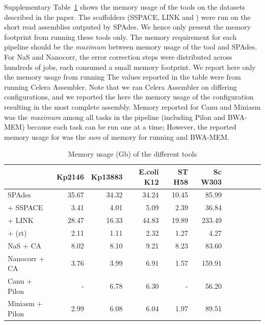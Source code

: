 Supplementary Table~\ref{T:mem} shows the memory usage of the tools on
the datasets described in the paper. The scaffolders (SSPACE, LINK and
\npscarf{}) were run on the short read assemblies outputed by SPAdes. We hence
only present the memory footprint from running these tools only. The memory
requirement for each pipeline should be the \emph{maximum} between memory usage
of the tool and SPAdes. For NaS and Nanocorr, the error correction steps were
distributed across hundreds of jobs, each consumed a small memory footprint. We
report here only the memory usage from running  The values reported in the table
were from running Celera Assembler. Note that we ran Celera Assembler on
differing configurations, and we reported the here the memory usage of the
configuration resulting in the most complete assembly.
Memory reported for Canu and Miniasm was the \emph{maximum} among all tasks
in the pipeline (including Pilon and BWA-MEM) because each task can be run one
at a time; However, the reported memory usage for \npscarf{} was the \emph{sum} of 
memory for running \npscarf{} and BWA-MEM.
\begin{table}[!hpt]
\centering
\caption{Memory usage (Gb) of the different tools}
\label{T:mem}
\begin{tabular}{lrrrrrrrrrr}
\toprule
 & Kp2146 & Kp13883 & E.coli K12 & ST H58 & Sc W303\\
\hline
SPAdes & 35.67 & 34.32 & 34.24 & 10.45 & 85.99 \\
 + SSPACE & 3.41 & 4.01 & 5.09 & 2.39 & 36.84 \\
 + LINK & 28.47 & 16.33 & 44.83 & 19.89 & 233.49 \\
 + \npscarf{}{} (rt) & 2.11 & 1.11 & 2.32 & 1.27 & 4.27\\
NaS + CA & 8.02 & 8.10 & 9.21 & 8.23 & 83.60 \\
Nanocorr + CA & 3.76 & 3.99 & 6.91 & 1.57 & 159.91 \\
Canu + Pilon & - & 6.78 & 6.30 & - & 56.20 \\
Miniasm + Pilon & 2.99 & 6.08 & 6.04 & 1.97 & 89.51 \\
\hline
\end{tabular}
\end{table}

